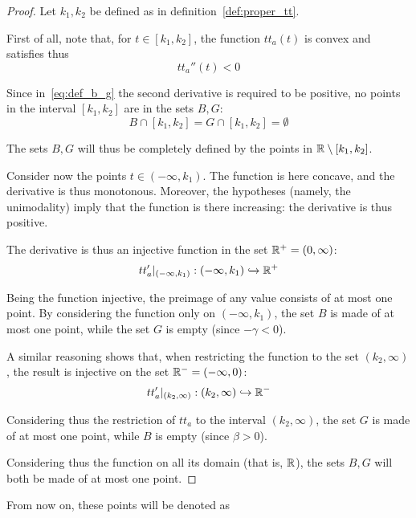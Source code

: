 \begin{proof}
  Let \(k_1, k_2\) be defined as in definition~\ref{def:proper_tt}.

  First of all, note that, for \(t\in[k_1, k_2]\), the function \(tt_a(t)\) is convex and satisfies thus
  \[tt_a''(t) < 0\]

  Since in~\eqref{eq:def_b_g} the second derivative is required to be positive,
  no points in the interval \([k_1, k_2]\) are in the sets \(B, G\):
  \begin{equation*}
    B\cap[k_1, k_2] = G\cap[k_1, k_2] = \emptyset
  \end{equation*}

  The sets \(B, G\) will thus be completely defined by the points in \(\mathbb{R}\setminus[k_1, k_2]\).

  Consider now the points \(t\in(-\infty, k_1)\).
  The function is here concave, and the derivative is thus monotonous.
  Moreover, the hypotheses (namely, the unimodality) imply that the function is there increasing:
  the derivative is thus positive.

  The derivative is thus an injective function in the set \(\mathbb{R}^+ = (0, \infty)\):
  \begin{equation*}
    tt_a'|_{(-\infty, k_1)}:(-\infty, k_1) \xhookrightarrow{} \mathbb{R}^+
  \end{equation*}

  Being the function injective, the preimage of any value consists of at most one point.
  By considering the function only on \((-\infty, k_1)\),
  the set \(B\) is made of at most one point,
  while the set \(G\) is empty (since \(-\gamma < 0\)).

  A similar reasoning shows that, when restricting the function to the set \((k_2, \infty)\),
  the result is injective on the set \(\mathbb{R}^- = (-\infty, 0)\):
  \begin{equation*}
    tt_a'|_{(k_2, \infty)}:(k_2, \infty) \hookrightarrow{} \mathbb{R}^-
  \end{equation*}

  Considering thus the restriction of \(tt_a\) to the interval \((k_2, \infty)\),
  the set \(G\) is made of at most one point,
  while \(B\) is empty (since \(\beta > 0\)).

  Considering thus the function on all its domain (that is, \(\mathbb{R}\)),
  the sets \(B, G\) will both be made of at most one point.

\end{proof}

From now on, these points will be denoted as

